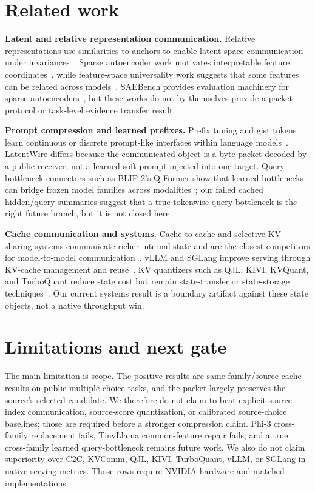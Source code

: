 \documentclass{article}
\newcommand{\method}{LatentWire}
\begin{document}
\section{Related work}

\textbf{Latent and relative representation communication.} Relative representations use similarities to anchors to enable latent-space communication under invariances~\citep{Moschella2023Relative}. Sparse autoencoder work motivates interpretable feature coordinates~\citep{Cunningham2023SAE}, while feature-space universality work suggests that some features can be related across models~\citep{Engels2024SAEUniversality}. SAEBench provides evaluation machinery for sparse autoencoders~\citep{Karvonen2025SAEBench}, but these works do not by themselves provide a packet protocol or task-level evidence transfer result.

\textbf{Prompt compression and learned prefixes.} Prefix tuning and gist tokens learn continuous or discrete prompt-like interfaces within language models~\citep{Li2021Prefix,Mu2023Gist}. \method{} differs because the communicated object is a byte packet decoded by a public receiver, not a learned soft prompt injected into one target. Query-bottleneck connectors such as BLIP-2's Q-Former show that learned bottlenecks can bridge frozen model families across modalities~\citep{Li2023BLIP2}; our failed cached hidden/query summaries suggest that a true tokenwise query-bottleneck is the right future branch, but it is not closed here.

\textbf{Cache communication and systems.} Cache-to-cache and selective KV-sharing systems communicate richer internal state and are the closest competitors for model-to-model communication~\citep{Fu2025C2C,Shi2025KVComm}. vLLM and SGLang improve serving through KV-cache management and reuse~\citep{Kwon2023vLLM,Zheng2023SGLang}. KV quantizers such as QJL, KIVI, KVQuant, and TurboQuant reduce state cost but remain state-transfer or state-storage techniques~\citep{Zandieh2024QJL,Liu2024KIVI,Hooper2024KVQuant,Zandieh2025TurboQuant}. Our current systems result is a boundary artifact against these state objects, not a native throughput win.

\section{Limitations and next gate}

The main limitation is scope. The positive results are same-family/source-cache results on public multiple-choice tasks, and the packet largely preserves the source's selected candidate. We therefore do not claim to beat explicit source-index communication, source-score quantization, or calibrated source-choice baselines; those are required before a stronger compression claim. Phi-3 cross-family replacement fails, TinyLlama common-feature repair fails, and a true cross-family learned query-bottleneck remains future work. We also do not claim superiority over C2C, KVComm, QJL, KIVI, TurboQuant, vLLM, or SGLang in native serving metrics. Those rows require NVIDIA hardware and matched implementations.
\end{document}
